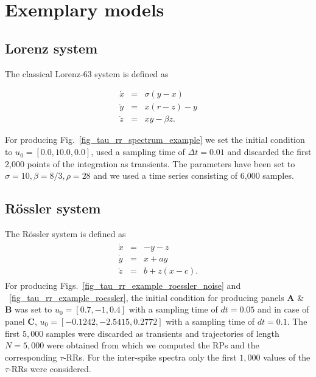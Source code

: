\documentclass[entropy,article,submit,pdftex,moreauthors]{Definitions/mdpi}
\begin{document}

\clearpage
\appendixstart
\appendix

\section{Exemplary models}

\subsection{Lorenz system}\label{sec_models_lorenz63}

\noindent The classical Lorenz-63 system \cite{lorenz1963} is defined as

\begin{equation}
\begin{array}{rcl}
\dot{x}&=&\sigma(y-x) \\
\dot{y}&=&x(r-z)-y \\
\dot{z}&=&xy - \beta z.
\end{array}
\label{eq_model_Lorenz63}
\end{equation}

\noindent For producing Fig.~\ref{fig_tau_rr_spectrum_example} we set the initial condition to $u_0=[0.0, 10.0, 0.0]$, used a sampling time of $\Delta t=0.01$ and discarded the first 
2,000 points of the integration as transients. The parameters have been set to 
$\sigma=10, \beta=8/3, \rho=28$ and we used a time series consisting of 6,000 samples.

\subsection{R\"ossler system}\label{sec_models_roessler}

\noindent The R\"ossler system \cite{roessler1976} is defined as
\begin{align}
\begin{array}{rcl}
\dot{x}&=&-y-z \\
\dot{y}&=&x+ay \\
\dot{z}&=&b+ z(x-c) .
\end{array}
\label{eq_model_roessler}
\end{align}
For producing Figs.~\ref{fig_tau_rr_example_roessler_noise} and ~\ref{fig_tau_rr_example_roessler}, the initial condition for producing panels \textbf{A} \& \textbf{B} was set to $u_0=[0.7, -1, 0.4]$ with a sampling time 
of $dt=0.05$ and in case of panel \textbf{C}, $u_0=[-0.1242, -2.5415, 0.2772]$ with a sampling time of $dt=0.1$. The first $5,000$ samples were discarded as transients and trajectories of length $N=5,000$ were 
obtained from which we computed the RPs and the corresponding $\tau$-RRs. For the inter-spike spectra only the first $1,000$ values of the $\tau$-RRs were considered.
\end{document}
